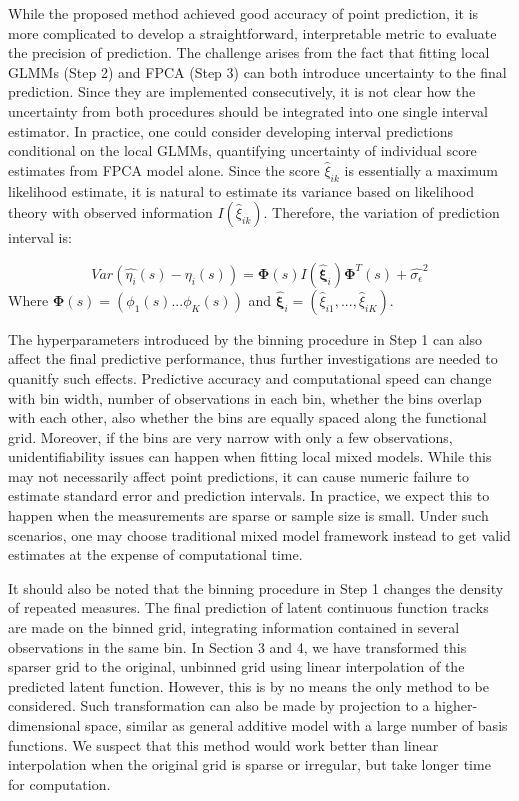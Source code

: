 \documentclass[
  11pt,
]{article}
\begin{document}
While the proposed method achieved good accuracy of point prediction, it
is more complicated to develop a straightforward, interpretable metric
to evaluate the precision of prediction. The challenge arises from the
fact that fitting local GLMMs (Step 2) and FPCA (Step 3) can both
introduce uncertainty to the final prediction. Since they are
implemented consecutively, it is not clear how the uncertainty from both
procedures should be integrated into one single interval estimator. In
practice, one could consider developing interval predictions conditional
on the local GLMMs, quantifying uncertainty of individual score
estimates from FPCA model alone. Since the score \(\hat{\xi}_{ik}\) is
essentially a maximum likelihood estimate, it is natural to estimate its
variance based on likelihood theory with observed information
\({I}(\hat{\xi}_{ik})\). Therefore, the variation of prediction interval
is:

\[Var(\hat{\eta_i}(s)-\eta_i(s))=\boldsymbol{\Phi}(s)I(\hat{\boldsymbol{\xi}}_i)\boldsymbol{\Phi}^T(s)+\hat{\sigma_{\epsilon}}^2\]
Where \(\boldsymbol{\Phi}(s)=(\phi_1(s)...\phi_K(s))\) and
\(\hat{\boldsymbol{\xi}}_i=(\hat{\xi}_{i1}, ...,\hat{\xi}_{iK})\).

The hyperparameters introduced by the binning procedure in Step 1 can
also affect the final predictive performance, thus further
investigations are needed to quanitfy such effects. Predictive accuracy
and computational speed can change with bin width, number of
observations in each bin, whether the bins overlap with each other, also
whether the bins are equally spaced along the functional grid. Moreover,
if the bins are very narrow with only a few observations,
unidentifiability issues can happen when fitting local mixed models.
While this may not necessarily affect point predictions, it can cause
numeric failure to estimate standard error and prediction intervals. In
practice, we expect this to happen when the measurements are sparse or
sample size is small. Under such scenarios, one may choose traditional
mixed model framework instead to get valid estimates at the expense of
computational time.

It should also be noted that the binning procedure in Step 1 changes the
density of repeated measures. The final prediction of latent continuous
function tracks are made on the binned grid, integrating information
contained in several observations in the same bin. In Section 3 and 4,
we have transformed this sparser grid to the original, unbinned grid
using linear interpolation of the predicted latent function. However,
this is by no means the only method to be considered. Such
transformation can also be made by projection to a higher-dimensional
space, similar as general additive model with a large number of basis
functions. We suspect that this method would work better than linear
interpolation when the original grid is sparse or irregular, but take
longer time for computation.
\end{document}
